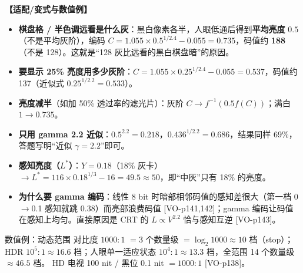 \textbf{【适配/变式与数值例】}
\begin{itemize}
\item \textbf{棋盘格 / 半色调远看是什么灰}：黑白像素各半，人眼低通后得到\textbf{平均亮度} $0.5$（不是平均灰阶），编码 $C=1.055\times0.5^{1/2.4}-0.055=0.735$，码值约 \textbf{188}（不是 128）。这就是“128 灰比远看的黑白棋盘暗”的原因。
\item \textbf{要显示 25\% 亮度用多少灰阶}：$C=1.055\times0.25^{1/2.4}-0.055=0.537$，码值约 137（近似式 $0.25^{1/2.2}=0.533$）。
\item \textbf{亮度减半}（如加 50\% 透过率的滤光片）：灰阶 $C\to f^{-1}(0.5f(C))$；满白 $1\to0.735$。
\item \textbf{只用 gamma 2.2 近似}：$0.5^{2.2}=0.218$，$0.436^{1/2.2}=0.686$，结果同样 69\%，答题写明“近似 $\gamma=2.2$”即可。
\item \textbf{感知亮度（$L^*$）}：$Y=0.18$（18\% 灰卡）$\to L^*=116\times0.18^{1/3}-16=49.5\approx50$，即“中灰”只有 18\% 的亮度。
\item \textbf{为什么要 gamma 编码}：线性 8 bit 时暗部相邻码值的感知差很大（第一档 0$\to$0.1 感知就跳 0.38）而亮部浪费码值 [VO-p141,142]；gamma 编码让码值在感知上均匀。直接原因是 CRT 的 $L\propto V^{2.2}$ 恰与感知互逆 [VO-p143]。
\end{itemize}

\begin{exam}{数值例：动态范围}
对比度 $1000:1$ $=3$ 个数量级 $=\log_2 1000\approx10$ 档（stop）；HDR $10^5:1\approx16.6$ 档；人眼单一适应状态 $10^4:1\approx13.3$ 档，全范围 14 个数量级 $\approx46.5$ 档。
HD 电视 100 nit / 黑位 0.1 nit $=1000:1$ [VO-p138]。
\end{exam}

